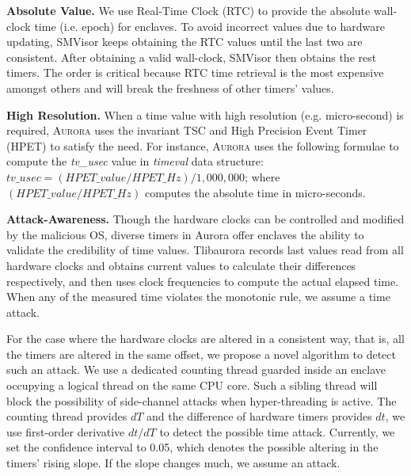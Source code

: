 \textbf{Absolute Value.}
We use Real-Time Clock (RTC) to provide the absolute wall-clock time (i.e. epoch) for enclaves. To avoid incorrect values due to hardware updating, SMVisor keeps obtaining the RTC values until the last two are consistent. After obtaining a valid wall-clock, SMVisor then obtains the rest timers. The order is critical because RTC time retrieval is the most expensive amongst others and will break the freshness of other timers' values.

\textbf{High Resolution.}
When a time value with high resolution (e.g. micro-second) is required, \textsc{Aurora} uses the invariant TSC and High Precision Event Timer (HPET) to satisfy the need. For instance, \textsc{Aurora} uses the following formulae to compute the \textit{tv\_usec} value in \textit{timeval} data structure: {$tv\_usec = (HPET\_value/ HPET\_Hz) / 1,000,000$;} where $(HPET\_value / HPET\_Hz)$ computes the absolute time in micro-seconds.

\textbf{Attack-Awareness.}
Though the hardware clocks can be controlled and modified by the malicious OS, diverse timers in Aurora offer enclaves the ability to validate the credibility of time values. Tlibaurora records last values read from all hardware clocks and obtains current values to calculate their differences respectively, and then uses clock frequencies to compute the actual elapsed time. When any of the measured time violates the monotonic rule, we assume a time attack.

For the case where the hardware clocks are altered in a consistent way, that is, all the timers are altered in the same offset, we propose a novel algorithm to detect such an attack. We use a dedicated counting thread \cite{DBLP:conf/dimva/SchwarzWGMM17} guarded inside an enclave occupying a logical thread on the same CPU core. Such a sibling thread will block the possibility of side-channel attacks when hyper-threading is active. The counting thread provides $dT$ and the difference of hardware timers provides $dt$, we use first-order derivative $dt/dT$ to detect the possible time attack. Currently, we set the confidence interval to 0.05, which denotes the possible altering in the timers' rising slope. If the slope changes much, we assume an attack.


